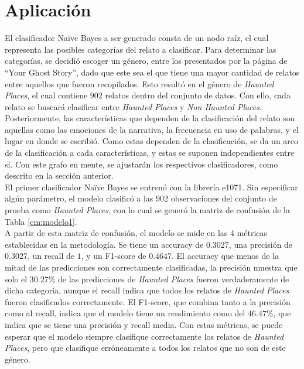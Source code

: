 \documentclass[12pt, letterpaper]{report}
\begin{document}
\section*{Aplicación}

El clasificador Naïve Bayes a ser generado consta de un nodo raíz, el cual representa las posibles categorías del relato a clasificar. Para determinar las categorías, se decidió escoger un género, entre los presentados por la página de “Your Ghost Story”, dado que este sea el que tiene una mayor cantidad de relatos entre aquellos que fueron recopilados. Esto resultó en el género de \textit{Haunted Places}, el cual contiene $902$ relatos dentro del conjunto de datos. Con ello, cada relato se buscará clasificar entre \textit{Haunted Places} y \textit{Non Haunted Places}.
\\

Posteriormente, las características que dependen de la clasificación del relato son aquellas como las emociones de la narrativa, la frecuencia en uso de palabras, y el lugar en donde se escribió. Como estas dependen de la clasificación, se da un arco de la clasificación a cada características, y estas se suponen independientes entre sí. Con este grafo en mente, se ajustarán los respectivos clasificadores, como descrito en la sección anterior.
\\

El primer clasificador Naïve Bayes se entrenó con la librería e1071. Sin especificar algún parámetro, el modelo clasificó a las $902$ observaciones del conjunto de prueba como \textit{Haunted Places}, con lo cual se generó la matriz de confusión de la Tabla \ref{cm:modelo1}.
\\

A partir de esta matriz de confusión, el modelo se mide en las 4 métricas establecidas en la metodología. Se tiene un accuracy de $0.3027$, una precisión de $0.3027$, un recall de $1$, y un F1-score de $0.4647$. El accuracy que menos de la mitad de las predicciones son correctamente clasificadas, la precisión muestra que solo el $30.27\%$ de las predicciones de \textit{Haunted Places} fueron verdaderamente de dicha categoría, aunque el recall indica que todos los relatos de \textit{Haunted Places} fueron clasificados correctamente. El F1-score, que combina tanto a la precisión como al recall, indica que el modelo tiene un rendimiento como del $46.47\%$, que indica que se tiene una precisión y recall media. Con estas métricas, se puede esperar que el modelo siempre clasifique correctamente los relatos de \textit{Haunted Places}, pero que clasifique erróneamente a todos los relatos que no son de este género.
\end{document}
